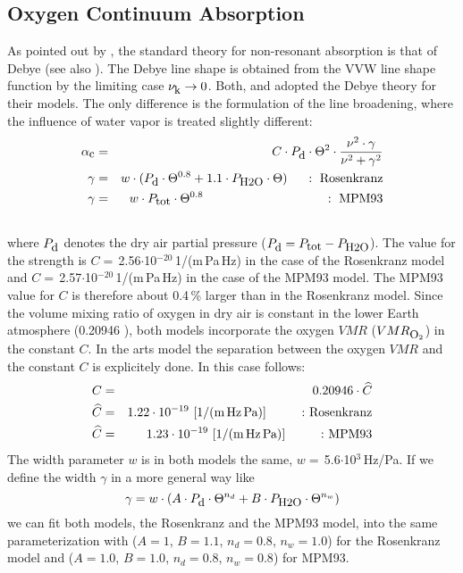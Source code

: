 \subsection{Oxygen Continuum Absorption}
\label{levelc:o2cont}
As pointed out by \citet{vv:87}, the standard theory for
non-resonant absorption is that of Debye (see also \citet{townes:55}). 
The Debye line shape is obtained from the VVW line shape function 
by the limiting case $\nu_{\mbox{\rm \small k}} \rightarrow 0$.
Both, \citet{liebeetal:93} and \citet{pwr:93} adopted the
Debye theory for their models. The only difference is the formulation
of the line broadening, where the influence of water vapor is treated 
slightly different: 
\begin{eqnarray}
  \label{eq:abs_cont_pwr_o2}
  \alphac &=&  C \cdot \pda \cdot \Theta^2 \cdot 
             \frac{\nu^2 \cdot \gamma}{\nu^2+\gamma^2}\\
  \label{eq:abs_cont_pwr_o2_1}
  \gamma &=&  w \cdot (\pda\cdot \Theta^{0.8} + 1.1 \cdot \phzo \cdot
  \Theta)\hspace*{5mm}:~\mbox{Rosenkranz}\\
  \label{eq:abs_cont_pwr_o2_2}
  \gamma &=&  w \cdot \ptot \cdot \Theta^{0.8}\hspace*{34mm}:~\mbox{MPM93}\\
\nonumber
\end{eqnarray}
where $P_{\mbox{\rm \small d}}$ denotes the dry air partial pressure ($P_{\mbox{\rm \small d}}=P_{\mbox{\rm \small tot}}-P_{\mbox{\rm \small H2O}}$). 
The value for the strength is $C =$\,2.56$\cdot$10$^{-20}$\,1/(m\,Pa\,Hz) 
in the case of the Rosenkranz model and 
$C =$\,2.57$\cdot$10$^{-20}$\,1/(m\,Pa\,Hz) in the case of the MPM93 model.
The MPM93 value for $C$ is therefore about 0.4\,\% larger than in the 
Rosenkranz model. Since the volume mixing ratio of oxygen in dry air
is constant in the lower Earth atmosphere (0.20946 \citep{goody:95}), 
both models incorporate the oxygen $VMR$ ($VMR_{\mbox{\rm \small O}_{2}}$) in the 
constant $C$. In the arts model the separation between the oxygen
$VMR$ and the constant $C$ is explicitely done. In this case follows:
\begin{eqnarray} 
 \label{eq:o2cont_const_vmr_1}
 C &=& 0.20946 \cdot \widehat{C}\\
 \label{eq:o2cont_const_vmr_2}
 \widehat{C} &=& 1.22\cdot 10^{-19}~\mbox{[1/(m\,Hz\,Pa)]\hspace{10mm}:~Rosenkranz} \\
 \label{eq:o2cont_const_vmr_3}
 \widehat{C} &=& 1.23\cdot 10^{-19}~\mbox{[1/(m\,Hz\,Pa)]\hspace{10mm}:~MPM93} 
\end{eqnarray} 
The width parameter $w$ is in both models the same, 
$w =$\,5.6$\cdot$10$^{3}$\,Hz/Pa. If we define the width $\gamma$ in a more 
general way like
\begin{equation} 
 \label{eq:o2_cont_gamma_general}
 \gamma = w \cdot \left( A \cdot P_{\mbox{\rm \small d}}  \cdot \Theta^{n_d} + 
                   B \cdot P_{\mbox{\rm \small H2O}} \cdot \Theta^{n_w} \right) 
\end{equation}
we can fit both models, the Rosenkranz and the MPM93 model, into the 
same parameterization with ($A=1$, $B=1.1$, $n_d=0.8$, $n_w=1.0$) for 
the Rosenkranz model and ($A=1.0$, $B=1.0$, $n_d=0.8$, $n_w=0.8$) for 
MPM93.

